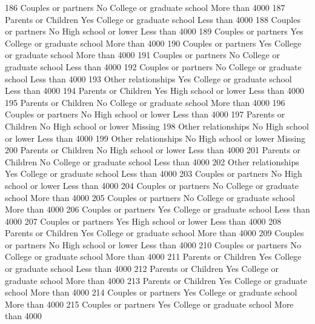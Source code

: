 \documentclass[
  letterpaper,
  DIV=11,
  numbers=noendperiod]{scrreprt}
\newenvironment{Shaded}{\begin{snugshade}}{\end{snugshade}}
\newcommand{\NormalTok}[1]{\textcolor[rgb]{0.00,0.23,0.31}{#1}}
\begin{document}
\begin{Shaded}
\begin{Highlighting}[]
\NormalTok{186 Couples or partners       No College or graduate school More than 4000}
\NormalTok{187 Parents or Children      Yes College or graduate school Less than 4000}
\NormalTok{188 Couples or partners       No       High school or lower Less than 4000}
\NormalTok{189 Couples or partners      Yes College or graduate school More than 4000}
\NormalTok{190 Couples or partners      Yes College or graduate school More than 4000}
\NormalTok{191 Couples or partners       No College or graduate school Less than 4000}
\NormalTok{192 Couples or partners       No College or graduate school Less than 4000}
\NormalTok{193 Other relationships      Yes College or graduate school Less than 4000}
\NormalTok{194 Parents or Children      Yes       High school or lower Less than 4000}
\NormalTok{195 Parents or Children       No College or graduate school More than 4000}
\NormalTok{196 Couples or partners       No       High school or lower Less than 4000}
\NormalTok{197 Parents or Children       No       High school or lower        Missing}
\NormalTok{198 Other relationships       No       High school or lower Less than 4000}
\NormalTok{199 Other relationships       No       High school or lower        Missing}
\NormalTok{200 Parents or Children       No       High school or lower Less than 4000}
\NormalTok{201 Parents or Children       No College or graduate school Less than 4000}
\NormalTok{202 Other relationships      Yes College or graduate school Less than 4000}
\NormalTok{203 Couples or partners       No       High school or lower Less than 4000}
\NormalTok{204 Couples or partners       No College or graduate school More than 4000}
\NormalTok{205 Couples or partners       No College or graduate school More than 4000}
\NormalTok{206 Couples or partners      Yes College or graduate school Less than 4000}
\NormalTok{207 Couples or partners      Yes       High school or lower Less than 4000}
\NormalTok{208 Parents or Children      Yes College or graduate school More than 4000}
\NormalTok{209 Couples or partners       No       High school or lower Less than 4000}
\NormalTok{210 Couples or partners       No College or graduate school More than 4000}
\NormalTok{211 Parents or Children      Yes College or graduate school Less than 4000}
\NormalTok{212 Parents or Children      Yes College or graduate school More than 4000}
\NormalTok{213 Parents or Children      Yes College or graduate school More than 4000}
\NormalTok{214 Couples or partners      Yes College or graduate school More than 4000}
\NormalTok{215 Couples or partners      Yes College or graduate school More than 4000}

\end{Highlighting}
\end{Shaded}
\end{document}
